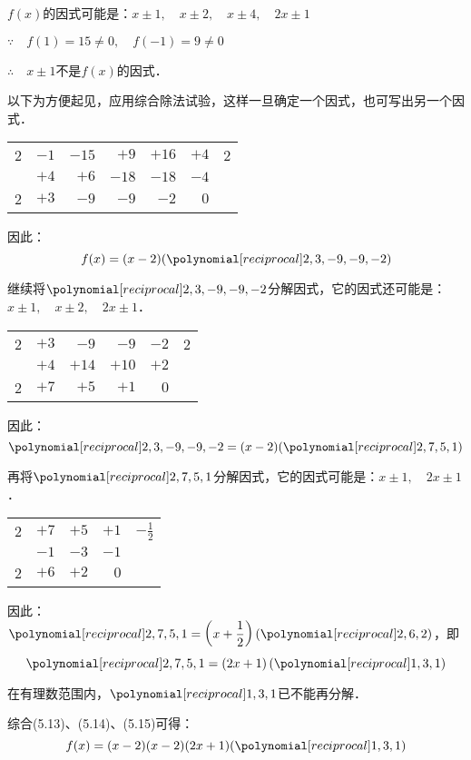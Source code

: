 \begin{solution}
$f(x)$的因式可能是：$x\pm 1,\quad x\pm 2,\quad x\pm 4,\quad 2x\pm 1$

$\because\quad f(1)=15\ne 0,\quad f(-1)=9\ne 0$

$\therefore\quad x\pm 1$不是$f(x)$的因式．

以下为方便起见，应用综合除法试验，这样一旦确定一个因式，也可写出另一个因式．
\begin{center}
    \begin{tabular}{rrrrrr|r}
       2   &  $-1$ &  $-15$  &  $+9$ & $+16$& $+4$  & 2\\
        \cline{7-7}
        & $+4$ & $+6$& $-18$& $-18$& $-4$\\
        \cline{1-6}
        2& $+3$ &$-9$ &$-9$&$-2$&  $\boxed{0}$\\
    \end{tabular}    
    \end{center}
因此：
\begin{equation}
    f(x)=(x-2)(\poly{2,3,-9,-9,-2})
\end{equation}

继续将$\poly{2,3,-9,-9,-2}$分解因式，它的因式还可能是：$x\pm 1,\quad x\pm 2,\quad 2x\pm 1$．
\begin{center}
    \begin{tabular}{rrrrr|r}
       2   &  $+3$ &  $-9$  &  $-9$ & $-2$  & 2\\
        \cline{6-6}
        & $+4$ & $+14$& $+10$& $+2$\\
        \cline{1-5}
        2& $+7$ &$+5$ &$+1$&  $\boxed{0}$\\
    \end{tabular}    
    \end{center}
    因此：
\begin{equation}
    \poly{2,3,-9,-9,-2}=(x-2)(\poly{2,7,5,1})  
\end{equation}

再将$\poly{2,7,5,1}$分解因式，它的因式可能是：$x\pm 1,\quad 2x\pm 1$．
\begin{center}
    \begin{tabular}{rrrr|r}
       2   &  $+7$ &  $+5$  &  $+1$  & $-\frac{1}{2}$\\
        \cline{5-5}
        & $-1$ & $-3$& $-1$\\
        \cline{1-4}
        2& $+6$ &$+2$&  $\boxed{0}$\\
    \end{tabular}    
    \end{center}
    因此：$\poly{2,7,5,1}=\left(x+\frac{1}{2}\right)(\poly{2,6,2})$，即
\begin{equation}
    \poly{2,7,5,1}=\left(2x+1\right)(\poly{1,3,1})
\end{equation}

在有理数范围内，$\poly{1,3,1}$已不能再分解．

综合(5.13)、(5.14)、(5.15)可得：
\[f(x)=(x-2)(x-2)(2x+1)(\poly{1,3,1})\]

\end{solution}

